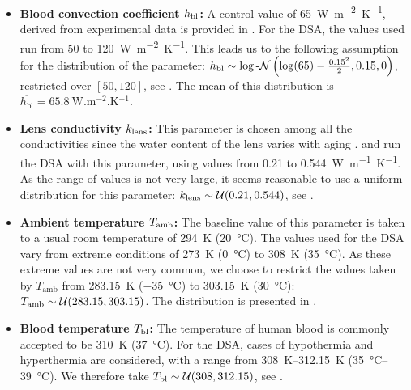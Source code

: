 \begin{itemize}
    \item \textbf{Blood convection coefficient $h_\text{\normalfont bl}$:} A control value of \qty{65}{\watt.\meter^{-2}.\kelvin^{-1}}, derived from experimental data \cite{Lagendijk_1982} is provided in \cite{Scott_1988}.
    For the DSA, the values used run from 50 to \qty{120}{\watt.\meter^{-2}.\kelvin^{-1}}.
    This leads us to the following assumption for the distribution of the parameter: $h_\text{bl}\sim \log\text{-}\mathcal{N}\left(\log(65)-\frac{0.15^2}{2}, 0.15, 0\right)$, restricted over $[50, 120]$, see .
    The mean of this distribution is $\overline{h_\text{bl}}=\qty{65.8}{\watt.\meter^{-2}.\kelvin^{-1}}$.

    \item \textbf{Lens conductivity $k_\text{\normalfont lens}$:} This parameter is chosen among all the conductivities since the water content of the lens varies with aging \cite{Scott_1988}.
    \cite{Scott_1988} and \cite{NG2006268} run the DSA with this parameter, using values from 0.21 to \qty{0.544}{\watt\metre^{-1}\kelvin^{-1}}.
    As the range of values is not very large, it seems reasonable to use a uniform distribution for this parameter: $k_\text{lens}\sim \mathcal{U}(0.21, 0.544)$, see .

    \item \textbf{Ambient temperature $T_\text{\normalfont amb}$:} The baseline value of this parameter is taken to a usual room temperature of \qty{294}{\kelvin} (\qty{20}{\celsius}).
    The values used for the DSA vary from extreme conditions of \qty{273}{\kelvin} (\qty{0}{\celsius}) to \qty{308}{\kelvin} (\qty{35}{\celsius}).
    As these extreme values are not very common, we choose to restrict the values taken by $T_\text{amb}$ from \qty{283.15}{\kelvin} (\qty{-35}{\celsius}) to \qty{303.15}{\kelvin} (\qty{30}{\celsius}): $T_\text{amb}\sim \mathcal{U}(283.15, 303.15)$.
    The distribution is presented in .

    \item \textbf{Blood temperature $T_\text{\normalfont bl}$:} The temperature of human blood is commonly accepted to be \qty{310}{\kelvin} (\qty{37}{\celsius}).
    For the DSA, cases of hypothermia and hyperthermia are considered, with a range from \qtyrange{308}{312.15}{\kelvin} (\qtyrange{35}{39}{\celsius}).
    We therefore take $T_\text{bl}\sim \mathcal{U}(308, 312.15)$, see .
\end{itemize}



